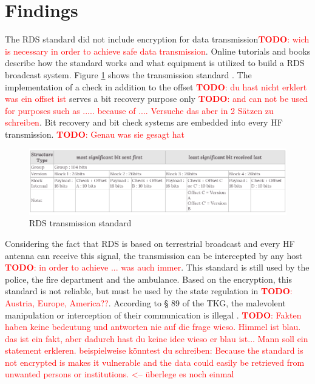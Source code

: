 \documentclass[conference,11pt,a4paper]{IEEEtran}
\newcommand{\todo}[1]{\textcolor{red}{\textbf{TODO}: #1}}
\begin{document}
	\section{Findings}
	
		The RDS standard did not include encryption for data transmission\todo{wich is necessary in order to achieve safe data transmission}. Online tutorials and books describe how the standard works and what equipment is utilized to build a RDS broadcast system. Figure \ref{fig: standard} shows the transmission standard \cite{DIN_EN}. The implementation of a check in addition to the offset \todo{du hast nicht erklert was ein offset ist} serves a bit recovery purpose only \todo{and can not be used for purposes such as ..... because of .... Versuche das aber in 2 Sätzen zu schreiben}. Bit recovery and bit check systems are embedded into every HF transmission. \todo{Genau was sie gesagt hat}
	
		\begin{figure}[h]
			\centering
			\includegraphics[scale=0.265]{img/standard}
			\caption{RDS transmission standard}
			\label{fig: standard}
		\end{figure}
	
		Considering the fact that RDS is based on terrestrial broadcast and every HF antenna can receive this signal, the transmission can be intercepted by any host \todo{in order to achieve ... was auch immer}. This standard is still used by the police, the fire department and the ambulance.  Based on the encryption, this standard is not reliable, but must be used by the state regulation in \todo{Austria, Europe, America??}. According to § 89 of the TKG, the malevolent manipulation or interception of their communication is illegal \cite{telecomGesetz}. \todo{Fakten haben keine bedeutung und antworten nie auf die frage wieso. Himmel ist blau. das ist ein fakt, aber dadurch hast du keine idee wieso er blau ist... Mann soll ein statement erkleren. beispielweise könntest du schreiben: Because the standard is not encrypted is makes it vulnerable and the data could easily be retrieved from unwanted persons or institutions. <-- überlege es noch einmal}\\
		
\end{document}
